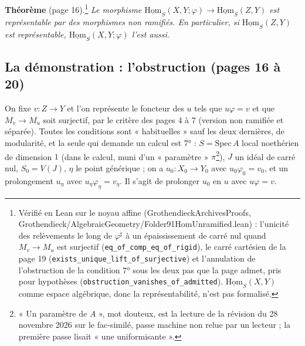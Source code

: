 \documentclass[11pt,a4paper]{article}
\begin{document}
\textbf{Théorème} (page 16).\footnote{Vérifié en Lean sur le noyau affine
(GrothendieckArchivesProofs, Grothendieck/AlgebraicGeometry/Folder91HomUnramified.lean) : l'unicité
des relèvements le long de $\varphi^\sharp$ à un épaississement de carré nul quand
$M_v \to M_u$ est surjectif (\texttt{eq\_of\_comp\_eq\_of\_rigid}), le carré
cartésien de la page 19 (\texttt{exists\_unique\_lift\_of\_surjective}) et
l'annulation de l'obstruction de la condition 7° sous les deux pas que la page
admet, pris pour hypothèses (\texttt{obstruction\_vanishes\_of\_admitted}).
$\underline{\mathrm{Hom}}_S(X, Y)$ comme espace algébrique, donc la
représentabilité, n'est pas formalisé.} \emph{Le morphisme
$\underline{\mathrm{Hom}}_S(X,Y;\varphi) \to \underline{\mathrm{Hom}}_S(Z,Y)$ est
représentable par des morphismes non ramifiés. En particulier, si
$\underline{\mathrm{Hom}}_S(Z,Y)$ est représentable, $\underline{\mathrm{Hom}}_S(X,Y;
\varphi)$ l'est aussi.}

\subsection*{La démonstration : l'obstruction (pages 16 à 20)}

On fixe $v : Z \to Y$ et l'on représente le foncteur des $u$ tels que
$u\varphi = v$ et que $M_v \to M_u$ soit surjectif, par le critère des
pages 4 à 7 (version non ramifiée et séparée). Toutes les conditions sont
« habituelles » sauf les deux dernières, de modularité, et la seule qui demande un
calcul est 7° : $S = \mathrm{Spec}\,A$ local noethérien de dimension $1$
(dans le calcul, muni d'un « paramètre » $\pi$\footnote{« Un paramètre de
$A$ », mot douteux, est la lecture de la révision du 28 novembre 2026 sur le fac-similé, passe machine non relue par un lecteur ; la première passe lisait « une
uniformisante ».}), $J$ un idéal de carré
nul, $S_0 = V(J)$, $\eta$ le point générique ; on a $u_0 : X_0 \to Y_0$ avec
$u_0\varphi_0 = v_0$, et un prolongement $u_\eta$ avec $u_\eta \varphi_\eta = v_\eta$.
Il s'agit de prolonger $u_0$ en $u$ avec $u\varphi = v$.
\end{document}
